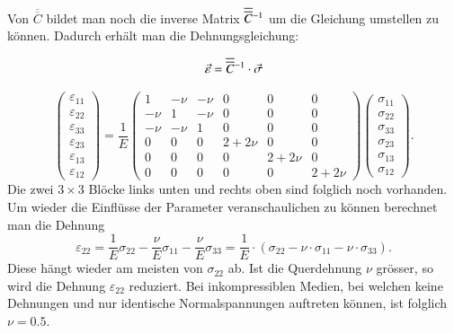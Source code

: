 Von  $\overline{\overline{C}}$ bildet man noch die inverse Matrix $\overline{\overline{C}}\mathstrut^{-1}$ um die Gleichung umstellen zu können.
Dadurch erhält man die Dehnungsgleichung:

\[
\vec{\varepsilon}
=
\overline{\overline{C}}\mathstrut^{-1}\cdot \vec{\sigma}
\]

\[
\begin{pmatrix}
	\varepsilon_{11}\\
	\varepsilon_{22}\\
	\varepsilon_{33}\\
	\varepsilon_{23}\\
	\varepsilon_{13}\\
	\varepsilon_{12}
\end{pmatrix}
=
\frac{1}{E}
\begin{pmatrix}
	   1 & -\nu & -\nu & 0      & 0      & 0     \\
	-\nu &    1 & -\nu & 0      & 0      & 0     \\
	-\nu & -\nu &    1 & 0      & 0      & 0     \\
 	   0 &    0 &    0 & 2+2\nu & 0      & 0     \\
	   0 &    0 &    0 &      0 & 2+2\nu & 0     \\
	   0 &    0 &    0 &      0 & 0      & 2+2\nu
\end{pmatrix}
\begin{pmatrix}
	\sigma_{11}\\
	\sigma_{22}\\
	\sigma_{33}\\
	\sigma_{23}\\
	\sigma_{13}\\
	\sigma_{12}
\end{pmatrix}
.
\]
Die zwei $3\times3$ Blöcke links unten und rechts oben sind folglich noch vorhanden.
Um wieder die Einflüsse der Parameter veranschaulichen zu können berechnet man die Dehnung
\[
\varepsilon_{22}
=
\frac{1}{E}\sigma_{22} - \frac{\nu}{E}\sigma_{11} - \frac{\nu}{E}\sigma_{33}
=
\frac{1}{E}\cdot(\sigma_{22}-\nu\cdot\sigma_{11}-\nu\cdot\sigma_{33})
.
\]
Diese hängt wieder am meisten von $\sigma_{22}$ ab.
Ist die Querdehnung $\nu$ grösser, so wird die Dehnung $\varepsilon_{22}$ reduziert.
Bei inkompressiblen Medien, bei welchen keine Dehnungen und nur identische Normalspannungen auftreten können, ist folglich $\nu=0.5$.

